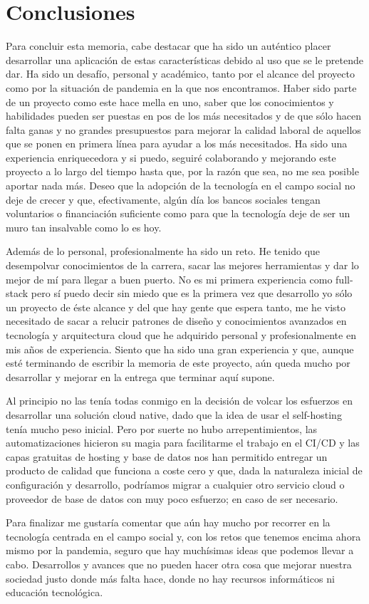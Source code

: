 \section{Conclusiones}
Para concluir esta memoria, cabe destacar que ha sido un auténtico placer desarrollar una aplicación de estas características debido al uso que se le pretende dar. Ha sido un desafío, personal y académico, tanto por el alcance del proyecto como por la situación de pandemia en la que nos encontramos. Haber sido parte de un proyecto como este hace mella en uno, saber que los conocimientos y habilidades pueden ser puestas en pos de los más necesitados y de que sólo hacen falta ganas y no grandes presupuestos para mejorar la calidad laboral de aquellos que se ponen en primera línea para ayudar a los más necesitados. Ha sido una experiencia enriquecedora y si puedo, seguiré colaborando y mejorando este proyecto a lo largo del tiempo hasta que, por la razón que sea, no me sea posible aportar nada más. Deseo que la adopción de la tecnología en el campo social no deje de crecer y que, efectivamente, algún día los bancos sociales tengan voluntarios o financiación suficiente como para que la tecnología deje de ser un muro tan insalvable como lo es hoy.
\vspace{1em}
\par Además de lo personal, profesionalmente ha sido un reto. He tenido que desempolvar conocimientos de la carrera, sacar las mejores herramientas y dar lo mejor de mí para llegar a buen puerto. No es mi primera experiencia como full-stack pero sí puedo decir sin miedo que es la primera vez que desarrollo yo sólo un proyecto de éste alcance y del que hay gente que espera tanto, me he visto necesitado de sacar a relucir patrones de diseño y conocimientos avanzados en tecnología y arquitectura cloud que he adquirido personal y profesionalmente en mis años de experiencia. Siento que ha sido una gran experiencia y que, aunque esté terminando de escribir la memoria de este proyecto, aún queda mucho por desarrollar y mejorar en la entrega que terminar aquí supone.
\vspace{1em}
\par Al principio no las tenía todas conmigo en la decisión de volcar los esfuerzos en desarrollar una solución cloud native, dado que la idea de usar el self-hosting tenía mucho peso inicial. Pero por suerte no hubo arrepentimientos, las automatizaciones hicieron su magia para facilitarme el trabajo en el CI/CD y las capas gratuitas de hosting y base de datos nos han permitido entregar un producto de calidad que funciona a coste cero y que, dada la naturaleza inicial de configuración y desarrollo, podríamos migrar a cualquier otro servicio cloud o proveedor de base de datos con muy poco esfuerzo; en caso de ser necesario.
\vspace{1em}
\par Para finalizar me gustaría comentar que aún hay mucho por recorrer en la tecnología centrada en el campo social y, con los retos que tenemos encima ahora mismo por la pandemia, seguro que hay muchísimas ideas que podemos llevar a cabo. Desarrollos y avances que no pueden hacer otra cosa que mejorar nuestra sociedad justo donde más falta hace, donde no hay recursos informáticos ni educación tecnológica.